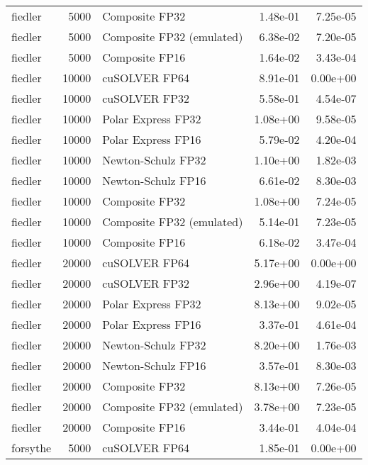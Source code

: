 \begin{table}
\begin{tabular}{lrlrr}
  fiedler &  5000 &            Composite FP32 &  1.48e-01 &        7.25e-05 \\
  fiedler &  5000 & Composite FP32 (emulated) &  6.38e-02 &        7.20e-05 \\
  fiedler &  5000 &            Composite FP16 &  1.64e-02 &        3.43e-04 \\
  fiedler & 10000 &             cuSOLVER FP64 &  8.91e-01 &        0.00e+00 \\
  fiedler & 10000 &             cuSOLVER FP32 &  5.58e-01 &        4.54e-07 \\
  fiedler & 10000 &        Polar Express FP32 &  1.08e+00 &        9.58e-05 \\
  fiedler & 10000 &        Polar Express FP16 &  5.79e-02 &        4.20e-04 \\
  fiedler & 10000 &        Newton-Schulz FP32 &  1.10e+00 &        1.82e-03 \\
  fiedler & 10000 &        Newton-Schulz FP16 &  6.61e-02 &        8.30e-03 \\
  fiedler & 10000 &            Composite FP32 &  1.08e+00 &        7.24e-05 \\
  fiedler & 10000 & Composite FP32 (emulated) &  5.14e-01 &        7.23e-05 \\
  fiedler & 10000 &            Composite FP16 &  6.18e-02 &        3.47e-04 \\
  fiedler & 20000 &             cuSOLVER FP64 &  5.17e+00 &        0.00e+00 \\
  fiedler & 20000 &             cuSOLVER FP32 &  2.96e+00 &        4.19e-07 \\
  fiedler & 20000 &        Polar Express FP32 &  8.13e+00 &        9.02e-05 \\
  fiedler & 20000 &        Polar Express FP16 &  3.37e-01 &        4.61e-04 \\
  fiedler & 20000 &        Newton-Schulz FP32 &  8.20e+00 &        1.76e-03 \\
  fiedler & 20000 &        Newton-Schulz FP16 &  3.57e-01 &        8.30e-03 \\
  fiedler & 20000 &            Composite FP32 &  8.13e+00 &        7.26e-05 \\
  fiedler & 20000 & Composite FP32 (emulated) &  3.78e+00 &        7.23e-05 \\
  fiedler & 20000 &            Composite FP16 &  3.44e-01 &        4.04e-04 \\
 forsythe &  5000 &             cuSOLVER FP64 &  1.85e-01 &        0.00e+00 \\

\end{tabular}
\end{table}
